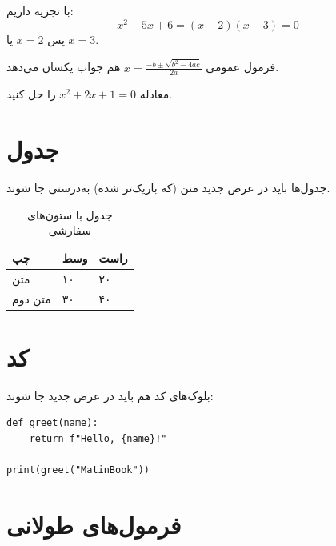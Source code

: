 \documentclass{matinbook}
\begin{document}
\begin{solution}
    با تجزیه داریم:
    \[
    x^2 - 5x + 6 = (x - 2)(x - 3) = 0
    \]
    پس $x = 2$ یا $x = 3$.
\end{solution}

\begin{remark}
    فرمول عمومی $x = \frac{-b \pm \sqrt{b^2 - 4ac}}{2a}$
    هم جواب یکسان می‌دهد.
\end{remark}

\begin{exercise}
    معادله $x^2 + 2x + 1 = 0$ را حل کنید.
\end{exercise}

\section{جدول}
\label{sec:table}

جدول‌ها باید در عرض جدید متن (که باریک‌تر شده) به‌درستی
جا شوند.

\begin{table}[h]
\centering
\caption{جدول با ستون‌های سفارشی}
\label{tab:layout-test}
\begin{tabular}{L{3cm} C{2cm} R{3cm}}
\toprule
\textbf{چپ} & \textbf{وسط} & \textbf{راست} \\
\midrule
متن & ۱۰ & ۲۰ \\
متن دوم & ۳۰ & ۴۰ \\
\bottomrule
\end{tabular}
\end{table}

\section{کد}
\label{sec:code}

بلوک‌های کد هم باید در عرض جدید جا شوند:

\begin{latin}
\begin{verbatim}
def greet(name):
    return f"Hello, {name}!"

print(greet("MatinBook"))
\end{verbatim}
\end{latin}

\section{فرمول‌های طولانی}
\label{sec:long-formulas}
\end{document}
